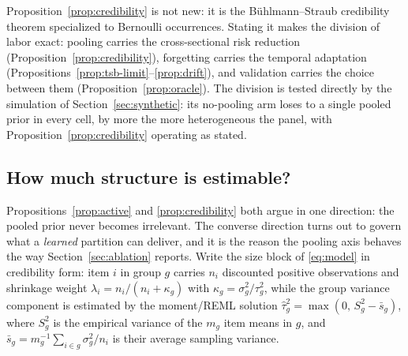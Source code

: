 \documentclass[twocolumn,10pt]{article}
\begin{document}
Proposition~\ref{prop:credibility} is not new: it is the
B\"uhlmann--Straub credibility theorem specialized to Bernoulli
occurrences. Stating it makes the division of labor exact: pooling
carries the cross-sectional risk reduction
(Proposition~\ref{prop:credibility}), forgetting carries the temporal
adaptation (Propositions~\ref{prop:tsb-limit}--\ref{prop:drift}), and
validation carries the choice between them
(Proposition~\ref{prop:oracle}). The division is tested directly by the
simulation of Section~\ref{sec:synthetic}: its no-pooling arm loses to a
single pooled prior in every cell, by more the more heterogeneous the
panel, with Proposition~\ref{prop:credibility} operating as stated.

\subsection{How much structure is estimable?}\label{sec:resolution}

Propositions~\ref{prop:active} and \ref{prop:credibility} both argue in
one direction: the pooled prior never becomes irrelevant. The converse
direction turns out to govern what a \emph{learned} partition can
deliver, and it is the reason the pooling axis behaves the way
Section~\ref{sec:ablation} reports. Write the size block of
\eqref{eq:model} in credibility form: item $i$ in group $g$ carries
$n_i$ discounted positive observations and shrinkage weight
$\lambda_i=n_i/(n_i+\kappa_g)$ with $\kappa_g=\sigma_g^2/\tau_g^2$,
while the group variance component is estimated by the
moment/REML solution $\hat\tau_g^2=\max(0,\,S_g^2-\bar s_g)$, where
$S_g^2$ is the empirical variance of the $m_g$ item means in $g$, and
$\bar s_g=m_g^{-1}\sum_{i\in g}\sigma_g^2/n_i$ is their average
sampling variance.
\end{document}
